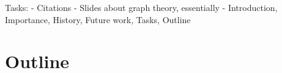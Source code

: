 \documentclass{nature}
\begin{document}
Tasks:
 - Citations
 - Slides about graph theory, essentially
 - Introduction, Importance, History, Future work, Tasks, Outline

\section{Outline}


\end{document}
